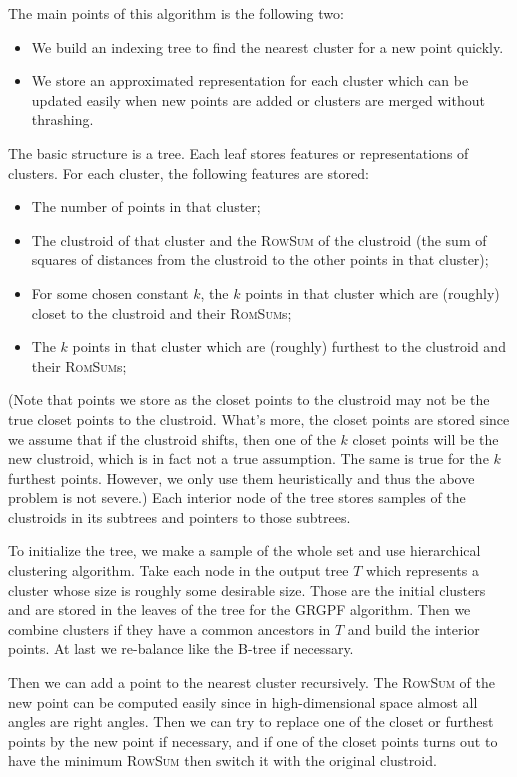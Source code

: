 \documentclass{article}
\begin{document}
The main points of this algorithm is the following two:
\begin{itemize}
\item We build an indexing tree to find the nearest cluster for a new point quickly.
\item We store an approximated representation for each cluster which can be updated easily when new points are added or clusters are merged without thrashing.
\end{itemize}

The basic structure is a tree. Each leaf stores features or representations of clusters. For each cluster, the following features are stored:
\begin{itemize}
\item The number of points in that cluster;
\item The clustroid of that cluster and the \textsc{RowSum} of the clustroid (the sum of squares of distances from the clustroid to the other points in that cluster);
\item For some chosen constant $k$, the $k$ points in that cluster which are (roughly) closet to the clustroid and their \textsc{RomSum}s;
\item The $k$ points in that cluster which are (roughly) furthest to the clustroid and their \textsc{RomSum}s;
\end{itemize}
(Note that points we store as the closet points to the clustroid may not be the true closet points to the clustroid. What's more, the closet points are stored since we assume that if the clustroid shifts, then one of the $k$ closet points will be the new clustroid, which is in fact not a true assumption. The same is true for the $k$ furthest points. However, we only use them heuristically and thus the above problem is not severe.) Each interior node of the tree stores samples of the clustroids in its subtrees and pointers to those subtrees.

To initialize the tree, we make a sample of the whole set and use hierarchical clustering algorithm. Take each node in the output tree $T$ which represents a cluster whose size is roughly some desirable size. Those are the initial clusters and are stored in the leaves of the tree for the GRGPF algorithm. Then we combine clusters if they have a common ancestors in $T$ and build the interior points. At last we re-balance like the B-tree if necessary.

Then we can add a point to the nearest cluster recursively. The \textsc{RowSum} of the new point can be computed easily since in high-dimensional space almost all angles are right angles. Then we can try to replace one of the closet or furthest points by the new point if necessary, and if one of the closet points turns out to have the minimum \textsc{RowSum} then switch it with the original clustroid. 
\end{document}
